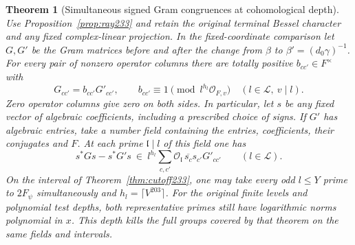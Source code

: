\documentclass[a4paper,11pt]{article}
\newtheorem{theorem}[proposition]{Theorem}
\theoremstyle{definition}
\theoremstyle{remark}
\numberwithin{equation}{section}
\newcommand{\OO}{\mathcal O}
\begin{document}
\begin{theorem}[Simultaneous signed Gram congruences at cohomological depth]
\label{thm:signed233}
Use Proposition~\ref{prop:ray233} and retain the original terminal
Bessel character and any fixed complex-linear projection. In the
fixed-coordinate comparison let \(G,G'\) be the Gram matrices before
and after the change from \(\beta\) to \(\beta'=(d_0\gamma)^{-1}\).
For every pair of nonzero operator columns there are totally positive
\(b_{cc'}\in F^\times\) with
\[
  G_{cc'}=b_{cc'}G'_{cc'},\qquad
  b_{cc'}\equiv1\pmod{l^{h_l}\OO_{F,v}}\quad
                  (l\in\mathcal L,\ v\mid l).
\]
Zero operator columns give zero on both sides. In particular, let
\(s\) be any fixed vector of algebraic coefficients, including a
prescribed choice of signs. If \(G'\) has algebraic entries, take
a number field containing the entries, coefficients, their conjugates
and \(F\). At each prime \(\mathfrak l\mid l\) of this field one has
\[
    s^*G s-s^*G's\ \in\ l^{h_l}
       \sum_{c,c'}\OO_{\mathfrak l}\,\overline{s_c}s_{c'}G'_{cc'}
                     \qquad(l\in\mathcal L).
\]
On the interval of Theorem~\ref{thm:cutoff233}, one may
take every odd \(l\le Y\) prime to \(2F_\psi\) simultaneously and
\(h_l=\lceil V^{203}\rceil\). For the original finite levels and
polynomial test depths, both representative primes still have
logarithmic norms polynomial in \(x\). This depth kills the full
groups covered by that theorem on the same fields and intervals.
\end{theorem}
\end{document}
